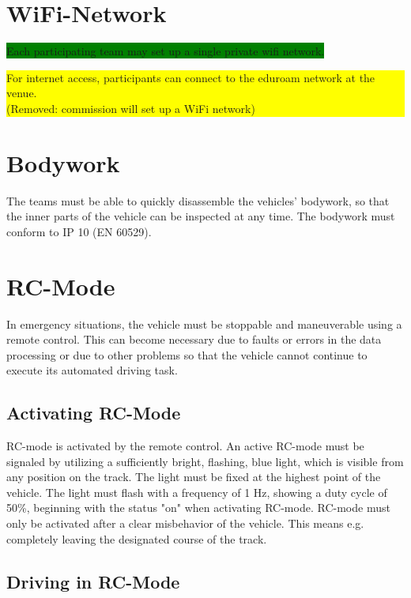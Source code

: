 \documentclass[a4paper]{report}
\newlength\colorboxwidth
\begin{document}
\section{WiFi-Network}

\colorbox{green}{Each participating team may set up a single private wifi network.}\\
\colorbox{yellow}{\parbox{\colorboxwidth}{For internet access, participants can connect to the eduroam network at the venue.\\
(Removed: commission will set up a WiFi network)}}

\section{Bodywork}

The teams must be able to quickly disassemble the vehicles’ bodywork, so that the inner parts of the vehicle can be inspected at any time. The bodywork must conform to IP 10 (EN 60529). 

\section{RC-Mode} 
\label{rc_mode}

In emergency situations, the vehicle must be stoppable and maneuverable using a remote control. This can become necessary due to faults or errors in the data processing or due to other problems so that the vehicle cannot continue to execute its automated driving task. 

\subsection{Activating RC-Mode} 

RC-mode is activated by the remote control. An active RC-mode must be signaled by utilizing a sufficiently bright, flashing, blue light, which is visible from any position on the track. The light must be fixed at the highest point of the vehicle. The light must flash with a frequency of 1 Hz, showing a duty cycle of 50\%, beginning with the status "on" when activating RC-mode. RC-mode must only be activated after a clear misbehavior of the vehicle. This means e.g. completely leaving the designated course of the track. 

\subsection{Driving in RC-Mode}
\end{document}
